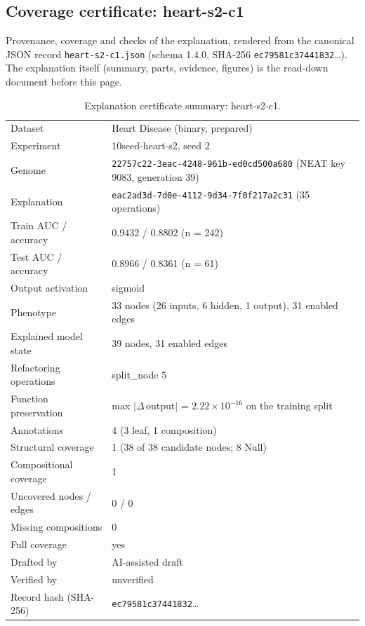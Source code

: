 \providecommand{\explaneatcertdir}[1]{}
\begin{drafted}
\section{Coverage certificate: heart-s2-c1}\label{app:heart-s2-c1:sec}
Provenance, coverage and checks of the explanation, rendered from the canonical JSON record \texttt{heart-s2-c1.json} (schema 1.4.0, SHA-256 \texttt{ec79581c37441832}\ldots). The explanation itself (summary, parts, evidence, figures) is the read-down document before this page.

\begin{table}[htbp]
\centering\small
\begin{tabularx}{\linewidth}{@{}lX@{}}
\toprule
Dataset & Heart Disease (binary, prepared) \\
Experiment & 10seed-heart-s2, seed 2 \\
Genome & \texttt{22757c22-3eac-4248-961b-ed0cd500a680} (NEAT key 9083, generation 39) \\
Explanation & \texttt{eac2ad3d-7d0e-4112-9d34-7f0f217a2c31} (35 operations) \\
Train AUC / accuracy & 0.9432 / 0.8802 (n = 242) \\
Test AUC / accuracy & 0.8966 / 0.8361 (n = 61) \\
Output activation & sigmoid \\
Phenotype & 33 nodes (26 inputs, 6 hidden, 1 output), 31 enabled edges \\
Explained model state & 39 nodes, 31 enabled edges \\
Refactoring operations & split\_\allowbreak{}node 5 \\
Function preservation & max $|\Delta\,\mathrm{output}|$ = $2.22\times 10^{-16}$ on the training split \\
Annotations & 4 (3 leaf, 1 composition) \\
Structural coverage & 1 (38 of 38 candidate nodes; 8 Null) \\
Compositional coverage & 1 \\
Uncovered nodes / edges & 0 / 0 \\
Missing compositions & 0 \\
Full coverage & yes \\
Drafted by & AI-assisted draft \\
Verified by & unverified \\
Record hash (SHA-256) & \texttt{ec79581c37441832}\ldots \\
\bottomrule
\end{tabularx}
\caption{Explanation certificate summary: heart-s2-c1.}
\label{app:heart-s2-c1:summary}
\end{table}

\end{drafted}
